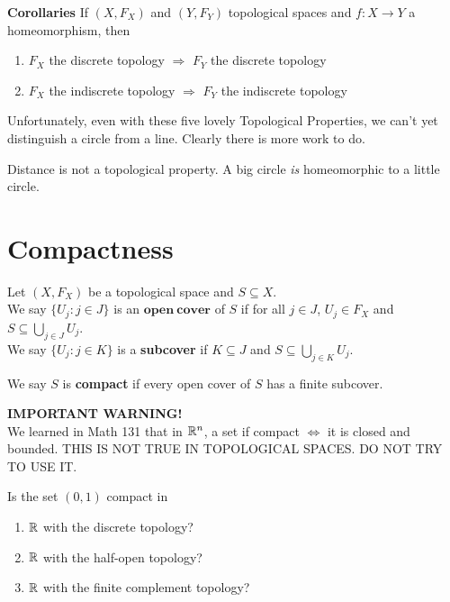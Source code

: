 {\bf Corollaries} If $(X, F_X) $ and $(Y, F_Y)$ topological spaces and $f: X \rightarrow Y$ a homeomorphism, then 
\begin{enumerate}
	\item $F_X$ the discrete topology $\Longrightarrow$ $F_Y$ the discrete topology 
	\item $F_X$ the indiscrete topology $\Longrightarrow$ $F_Y$ the indiscrete topology 
\end{enumerate}

Unfortunately, even with these five lovely Topological Properties, we can't yet distinguish a circle from a line. Clearly there is more work to do.
\begin{example}
	Distance is not a topological property. A big circle \emph{is} homeomorphic to a little circle. 
\end{example}

\section{Compactness}
\begin{definition}
	Let $(X, F_X)$ be a topological space and $S \subseteq X$.\\
	We say $\{U_j : j \in J\}$ is an $\mathbf{open \ cover}$ of $S$ if for all $j \in J$, $U_j \in F_X$ and $S \subseteq \bigcup_{j \in J}U_j$.\\
	We say $\{U_j : j \in K\}$ is a {\bf subcover} if $K \subseteq J$ and $S \subseteq \bigcup_{j \in K} U_j$.
	
	We say $S$ is {\bf compact} if every open cover of $S$ has a finite subcover. 
\end{definition}

{\bf IMPORTANT WARNING!}\\
We learned in Math 131 that in $\mathbb R^{n}$, a set if compact $\Longleftrightarrow$ it is closed and bounded. THIS IS NOT TRUE IN TOPOLOGICAL SPACES. DO NOT TRY TO USE IT.
\begin{example}
	Is the set $(0,1)$ compact in 
	\begin{enumerate}
		\item $\mathbb R$ with the discrete topology? 
		\item $\mathbb R$ with the half-open topology? 
		\item $\mathbb R$ with the finite complement topology? 
	\end{enumerate}
\end{example}

